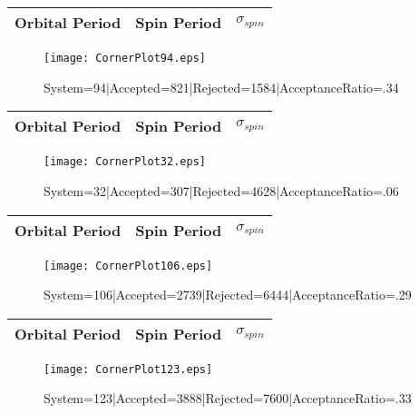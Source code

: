 \documentclass[10pt]{article}
\begin{document}
\begin{center}
        \begin{tabular}{|c|c|c|}
        \hline
Orbital Period & Spin Period & $\sigma_{spin}$ \\
 \hline
        \end{tabular}
        \end{center}
\begin{figure}[h] 
        \texttt{[image: CornerPlot94.eps]}
        \caption{System=94|Accepted=821|Rejected=1584|AcceptanceRatio=.34}
        \label{S94}
        \centering
        \end{figure}
\begin{center}
        \begin{tabular}{|c|c|c|}
        \hline
Orbital Period & Spin Period & $\sigma_{spin}$ \\
 \hline
        \end{tabular}
        \end{center}
\begin{figure}[h] 
        \texttt{[image: CornerPlot32.eps]}
        \caption{System=32|Accepted=307|Rejected=4628|AcceptanceRatio=.06}
        \label{S32}
        \centering
        \end{figure}
\begin{center}
        \begin{tabular}{|c|c|c|}
        \hline
Orbital Period & Spin Period & $\sigma_{spin}$ \\
 \hline
        \end{tabular}
        \end{center}
\begin{figure}[h] 
        \texttt{[image: CornerPlot106.eps]}
        \caption{System=106|Accepted=2739|Rejected=6444|AcceptanceRatio=.29}
        \label{S106}
        \centering
        \end{figure}
\begin{center}
        \begin{tabular}{|c|c|c|}
        \hline
Orbital Period & Spin Period & $\sigma_{spin}$ \\
 \hline
        \end{tabular}
        \end{center}
\begin{figure}[h] 
        \texttt{[image: CornerPlot123.eps]}
        \caption{System=123|Accepted=3888|Rejected=7600|AcceptanceRatio=.33}
        \label{S123}
        \centering
        \end{figure}
\end{document}
